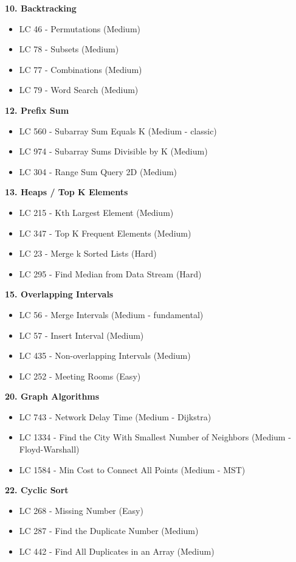 \documentclass[10pt]{article}
\begin{document}
\textbf{10. Backtracking}
\begin{itemize}
\item LC 46 - Permutations (Medium)
\item LC 78 - Subsets (Medium)
\item LC 77 - Combinations (Medium)
\item LC 79 - Word Search (Medium)
\end{itemize}

\textbf{12. Prefix Sum}
\begin{itemize}
\item LC 560 - Subarray Sum Equals K (Medium - classic)
\item LC 974 - Subarray Sums Divisible by K (Medium)
\item LC 304 - Range Sum Query 2D (Medium)
\end{itemize}

\textbf{13. Heaps / Top K Elements}
\begin{itemize}
\item LC 215 - Kth Largest Element (Medium)
\item LC 347 - Top K Frequent Elements (Medium)
\item LC 23 - Merge k Sorted Lists (Hard)
\item LC 295 - Find Median from Data Stream (Hard)
\end{itemize}

\textbf{15. Overlapping Intervals}
\begin{itemize}
\item LC 56 - Merge Intervals (Medium - fundamental)
\item LC 57 - Insert Interval (Medium)
\item LC 435 - Non-overlapping Intervals (Medium)
\item LC 252 - Meeting Rooms (Easy)
\end{itemize}

\textbf{20. Graph Algorithms}
\begin{itemize}
\item LC 743 - Network Delay Time (Medium - Dijkstra)
\item LC 1334 - Find the City With Smallest Number of Neighbors (Medium - Floyd-Warshall)
\item LC 1584 - Min Cost to Connect All Points (Medium - MST)
\end{itemize}

\textbf{22. Cyclic Sort}
\begin{itemize}
\item LC 268 - Missing Number (Easy)
\item LC 287 - Find the Duplicate Number (Medium)
\item LC 442 - Find All Duplicates in an Array (Medium)
\end{itemize}
\end{document}
